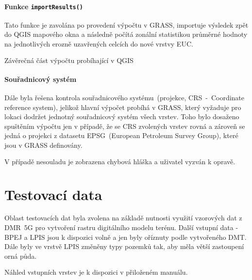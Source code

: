 \paragraph{Funkce \texttt{importResults()}}
Tato funkce je zavolána po provedení výpočtu v GRASS, importuje výsledek zpět do QGIS mapového okna a následně počítá zonální statistikou průměrné hodnoty na jednotlivých erozně uzavřených celcích do nové vrstvy EUC.
\begin{algorithm}
\caption{Závěrečná část výpočtu probíhající v QGIS}
\label{alg:onAddKFactor}
    \begin{algorithmic}[1]
    \end{algorithmic}
\end{algorithm}

\paragraph{Souřadnicový systém}
Dále byla řešena kontrola souřadnicového systému~(projekce, CRS~-~Coordinate reference system), jelikož hlavní výpočet probíhá v GRASS, který vyžaduje pro lokaci dodržet jednotný souřadnicový systém všech vrstev. Toho bylo dosaženo spuštěním výpočtu jen v případě, že se CRS zvolených vrstev rovná a zároveň se jedná o projekci z datasetu EPSG~(European Petroleum Survey Group), které jsou v GRASS definovány.

V případě nesouladu je zobrazena chybová hláška a uživatel vyzván k opravě.

\section{Testovací data}
Oblast testovacích dat byla zvolena na základě nutnosti využití vzorových dat z DMR~5G pro vytvoření rastru digitálního modelu terénu. Další vstupní data - BPEJ a LPIS jsou k dispozici volně a jen byly oříznuty podle vytvořeného DMT. Dále byly ve vrstvě LPIS změněny typy pozemků tak, aby měla větší zastoupení orná půda.

Náhled vstupních vrstev je k dispozici v přiloženém manuálu.
